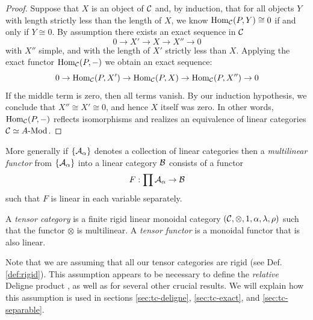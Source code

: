 \documentclass{amsart}
\begin{document}
\begin{proof}
Suppose that $X$ is an object of $\mathcal C$ and, by induction, that for all objects $Y$ with length strictly less than the length of $X$, we know $\operatorname{Hom}_{\mathcal C}(P,Y) \cong 0$ if and only if $Y \cong 0$. By assumption there exists an exact sequence in $\mathcal C$
\begin{equation*}
	0 \to X' \to X \to X'' \to 0
\end{equation*}
with $X''$ simple, and with the length of $X'$ strictly less than $X$. Applying the exact functor $\operatorname{Hom}_{\mathcal C}(P,-)$ we obtain an exact sequence:
\begin{equation*}
	0 \to \operatorname{Hom}_{\mathcal C}(P,X') \to \operatorname{Hom}_{\mathcal C}(P,X) \to \operatorname{Hom}_{\mathcal C}(P,X'') \to 0
\end{equation*}
If the middle term is zero, then all terms vanish. By our induction hypothesis, we conclude that $X'' \cong X' \cong 0$, and hence $X$ itself was zero. In other words, $\operatorname{Hom}_{\mathcal C}(P,-)$ reflects isomorphisms and realizes an equivalence of linear categories $\cC \simeq \Mod{A}{}$.
\end{proof}


	
More generally if $\{\mathcal A_\alpha\}$ denotes a collection of linear categories then a {\em multilinear functor} from $\{\mathcal A_\alpha\}$ into a linear category $\mathcal B$ consists of a functor
\begin{equation*}
	F: \prod \mathcal A_\alpha \to \mathcal B
\end{equation*}
such that $F$ is linear in each variable separately. 



\begin{definition}
	A {\em tensor category} is a finite rigid linear monoidal category $(\mathcal C, \otimes, 1, \alpha, \lambda, \rho)$ such that the functor $\otimes$ is multilinear. A {\em tensor functor} is a monoidal functor that is also linear. 
\end{definition}

\noindent Note that we are assuming that all our tensor categories are rigid (see Def. \ref{def:rigid}). This assumption appears to be necessary to define the {\em relative} Deligne product , as well as for several other crucial results. We will explain how this assumption is used in sections \ref{sec:tc-deligne}, \ref{sec:tc-exact}, and \ref{sec:tc-separable}.
\end{document}
